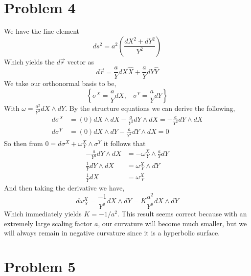 \documentclass{article}
\theoremstyle{definition}
\begin{document}
\section*{Problem 4}
We have the line element 
\[
    ds^2 = a^2\left(\frac{dX^2 + dY^2}{Y^2}\right)
\]
Which yields the $d\vec r$ vector as 
\[
    d\vec r = \frac{a}{Y}dX \hat X + \frac{a}{Y} dY \hat{Y}
\]
We take our orthonormal basis to be,
\[\left\{\sigma^X = \frac{a}{Y} dX, \ \ \ \ \sigma^Y = \frac{a}{Y} dY\right\}\]
With $\omega = \frac{a^2}{Y^2}dX \wedge dY$. By the structure equations we can derive the following,
\begin{align*}
    d\sigma^X &= (0)dX \wedge dX - \frac{a}{Y^2} dY \wedge dX = -\frac{a}{Y^2} dY \wedge dX\\
    d\sigma^Y &= (0)dX \wedge dY - \frac{a}{Y^2} dY \wedge dX = 0
\end{align*}
So then from $0 = d\sigma^X + \omega^X_{\ Y} \wedge \sigma^Y$ it follows that 
\begin{align*}
    -\frac{a}{Y^2} dY \wedge dX &= -\omega^X_{\ Y} \wedge \frac{a}{Y}dY \\
    \frac{1}{Y} dY \wedge dX &= \omega^X_{\ Y} \wedge dY \\
    \frac{1}{Y}dX &= \omega^X_{\ Y} 
\end{align*}
And then taking the derivative we have, \[
    d\omega^X_{\ Y} = \frac{-1}{Y^2}dX \wedge dY = K \frac{a^2}{Y^2} dX \wedge dY
    \] 
Which immediately yields $K = -1 / a^2$. This result seems correct because with an extremely large scaling 
factor $a$, our curvature will become much smaller, but we will always remain in negative curvature since it is a hyperbolic surface.
\section*{Problem 5}
\end{document}

